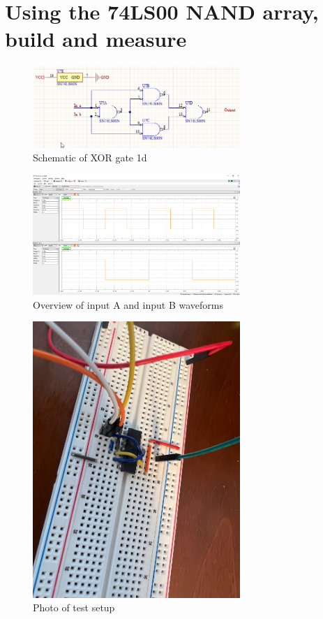 \documentclass{article}
\begin{document}
	\section{Using the 74LS00 NAND array, build and measure}
	
	\begin{figure}[H]
	    \centering
	    \includegraphics[width=0.7\textwidth]{3a-xor-lab}
	    \caption{Schematic of XOR gate 1d}
	\end{figure}
	
	\begin{figure}[H]
	    \centering
	    \includegraphics[width=0.7\textwidth]{3a-setup}
	    \caption{Overview of input A and input B waveforms}
	\end{figure}
	
	\begin{figure}[H]
	    \centering
	    \includegraphics[width=0.7\textwidth]{3a-xor-photo}
	    \caption{Photo of test setup}
	\end{figure}
	
\end{document}
